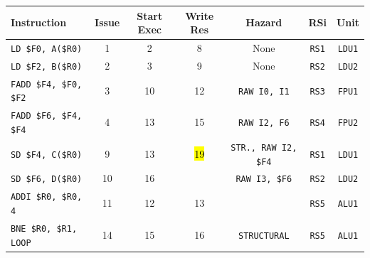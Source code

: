 \begin{enumerate}
    \begin{table}[!htp]
        \centering
        \begin{adjustbox}{width={\textwidth},totalheight={\textheight},keepaspectratio}
        \begin{tabular}{@{} l c c c c c c @{}}
            \toprule
            \textbf{Instruction} & \textbf{Issue} & \textbf{Start Exec} & \textbf{Write Res} & \textbf{Hazard} & \textbf{RSi} & \textbf{Unit} \\
            \midrule
            \texttt{LD \$F0, A(\$R0)}       & 1 & 2 & 8 & None  & \texttt{RS1}   & \texttt{LDU1}  \\ [.5em]
            \texttt{LD \$F2, B(\$R0)}       & 2 & 3 & 9 & None  & \texttt{RS2}   & \texttt{LDU2}  \\ [.5em]
            \texttt{FADD \$F4, \$F0, \$F2}  & 3 & 10 & 12 & \texttt{RAW I0, I1} & \texttt{RS3} & \texttt{FPU1} \\ [.5em]
            \texttt{FADD \$F6, \$F4, \$F4}  & 4 & 13 & 15 & \texttt{RAW I2, F6} & \texttt{RS4} & \texttt{FPU2} \\ [.5em]
            \texttt{SD \$F4, C(\$R0)}       & 9 & 13 & \hl{19} & \texttt{STR., RAW I2, \$F4} & \texttt{RS1} & \texttt{LDU1} \\ [.5em]
            \texttt{SD \$F6, D(\$R0)}       & 10 & 16 &   & \texttt{RAW I3, \$F6} & \texttt{RS2} & \texttt{LDU2} \\ [.5em]
            \texttt{ADDI \$R0, \$R0, 4}     & 11 & 12 & 13 &       & \texttt{RS5} & \texttt{ALU1} \\ [.5em]
            \texttt{BNE \$R0, \$R1, LOOP}   & 14 & 15 & 16 & \texttt{STRUCTURAL} & \texttt{RS5} & \texttt{ALU1} \\
            \bottomrule
        \end{tabular}
        \end{adjustbox}
    \end{table}
    

\end{enumerate}
